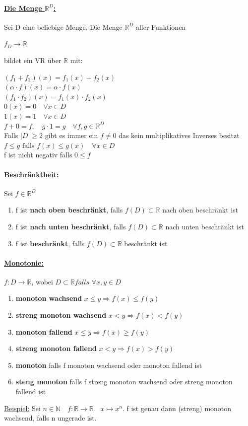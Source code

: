 \documentclass[8pt]{extreport}
\begin{document}
\paragraph{\underline{ Die Menge $\mathbb {R}^D$:}} Sei D eine beliebige Menge. Die Menge $\mathbb{R}^D$ aller Funktionen
\begin{center}
$f_ D \rightarrow \mathbb{R}$
\end{center}
bildet ein VR über $\mathbb{R}$ mit:
\begin{center}
$(f_1 + f_2)(x) = f_1(x) + f_2(x)$\\
$(\alpha \cdot f)(x) = \alpha \cdot f(x)$\\
$(f_1 \cdot f_2)(x) = f_1(x)\cdot f_2(x)$\\
$\mathit{0}(x)  = 0 \quad \forall x \in D$\\
$\mathit{1}(x) = 1 \quad \forall x \in D$\\
$ f + \mathit{0} = f, \quad g \cdot \mathit{1} = g \quad  \forall f,g \in \mathbb{R}^D$\\
Falls $|D| \geq 2$ gibt es immer ein $f \neq \mathit{0}$ das kein multiplikatives Inverses besitzt\\
$ f \leq g \text{ falls } f(x) \leq g(x) \quad \forall x \in D$\\
f ist nicht negativ falls $0\leq f$
\end{center}
\paragraph{\underline{Beschränktheit:}} Sei $f \in \mathbb{R}^D$
\begin{enumerate}
\item f ist \textbf{nach oben beschränkt}, falls $f(D) \subset \mathbb{R}$ nach oben beschränkt ist
\item f ist \textbf{nach unten beschränkt}, falls $f(D) \subset \mathbb{R}$ nach unten beschränkt ist
\item f ist \textbf{beschränkt}, falls $f(D) \subset \mathbb{R}$ beschränkt ist.
\end{enumerate}
\paragraph{\underline{Monotonie:}} $f: D \rightarrow \mathbb{R}$, wobei $D \subset \mathbb{R} falls $ $\forall x,y \in D$
\begin{enumerate}
\item \textbf{monoton wachsend} $ x\leq y \Rightarrow f(x) \leq f(y)$
\item \textbf{streng monoton wachsend} $ x<y \Rightarrow f(x) < f(y)$
\item \textbf{monoton fallend} $ x \leq y \Rightarrow f(x)  \geq f(y)$
\item \textbf{streng monoton fallend} $ x<y \Rightarrow f(x) > f(y)$
\item \textbf{monoton} falls f monoton wachsend oder monoton fallend ist
\item \textbf{steng monoton} falls f streng monoton wachsend oder streng monoton fallend ist
\end{enumerate}
\underline{Beispiel:} Sei $n \in \mathbb{N} \quad f: \mathbb{R} \rightarrow \mathbb{R} \quad x \mapsto x^n$. f ist genau dann (streng) monoton wachsend, falls n ungerade ist.
\end{document}
